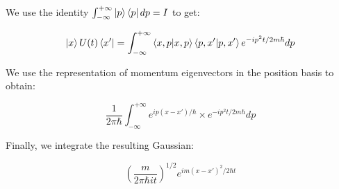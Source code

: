 
We use the identity $\int_{-\infty}^{+\infty} \ket{p}\bra{p} dp = I$ to get:

\begin{equation}
   \ket{x} U(t) \bra{x'} = \int_{-\infty}^{+\infty} \braket{x,p}\braket{p,x'} e^{-ip^2t/2m\hbar} dp
\end{equation}

We use the representation of momentum eigenvectors in the position basis to obtain:

\begin{equation}
   \frac{1}{2 \pi \hbar} \int_{-\infty}^{+\infty} e^{ip(x-x')/\hbar} \times e^{-ip^2t/2m\hbar} dp
\end{equation}

Finally, we integrate the resulting Gaussian:

\begin{equation}
   (\frac{m}{2 \pi \hbar i t})^{1/2} e^{im(x-x')^2/2 \hbar t}
\end{equation}
